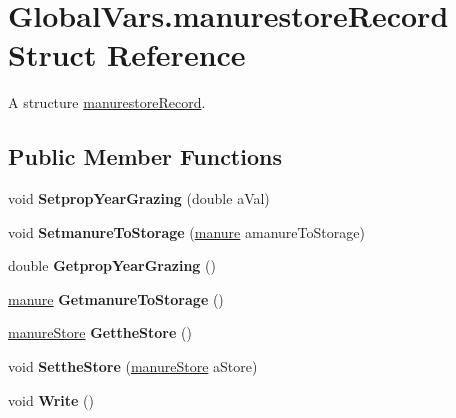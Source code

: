 \hypertarget{struct_global_vars_1_1manurestore_record}{}\section{Global\+Vars.\+manurestore\+Record Struct Reference}
\label{struct_global_vars_1_1manurestore_record}


A structure \mbox{\hyperlink{struct_global_vars_1_1manurestore_record}{manurestore\+Record}}.  


\subsection*{Public Member Functions}
\begin{DoxyCompactItemize}
\item 
\mbox{\label{struct_global_vars_1_1manurestore_record_a159a0073b4ebf619056dd88a4e2aa7b8}} 
void {\bfseries Setprop\+Year\+Grazing} (double a\+Val)
\item 
\mbox{\label{struct_global_vars_1_1manurestore_record_abc16bb40bedf65c707279636db4de2c1}} 
void {\bfseries Setmanure\+To\+Storage} (\mbox{\hyperlink{classmanure}{manure}} amanure\+To\+Storage)
\item 
\mbox{\label{struct_global_vars_1_1manurestore_record_a94105a074cd1fce9bfd6ee546f399eea}} 
double {\bfseries Getprop\+Year\+Grazing} ()
\item 
\mbox{\label{struct_global_vars_1_1manurestore_record_a4b01a06869a3a1bda10569c2f15a65b3}} 
\mbox{\hyperlink{classmanure}{manure}} {\bfseries Getmanure\+To\+Storage} ()
\item 
\mbox{\label{struct_global_vars_1_1manurestore_record_acc9b60e40c02a7a9062f6f4721b193da}} 
\mbox{\hyperlink{classmanure_store}{manure\+Store}} {\bfseries Getthe\+Store} ()
\item 
\mbox{\label{struct_global_vars_1_1manurestore_record_a74da5cde1b258bda8027cd39ece813fa}} 
void {\bfseries Setthe\+Store} (\mbox{\hyperlink{classmanure_store}{manure\+Store}} a\+Store)
\item 
\mbox{\label{struct_global_vars_1_1manurestore_record_a2f25777efedfd194220f7703abf3f212}} 
void {\bfseries Write} ()
\end{DoxyCompactItemize}
